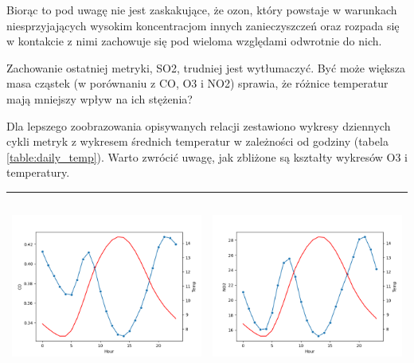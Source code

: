 \documentclass[18pt, letterpaper]{article}
\begin{document}
Biorąc to pod uwagę nie jest zaskakujące, że ozon, który powstaje w warunkach niesprzyjających wysokim koncentracjom innych zanieczyszczeń oraz rozpada się w kontakcie z nimi zachowuje się pod wieloma względami odwrotnie do nich.

Zachowanie ostatniej metryki, SO2, trudniej jest wytłumaczyć. Być może większa masa cząstek (w porównaniu z CO, O3 i NO2) sprawia, że różnice temperatur mają mniejszy wpływ na ich stężenia?

Dla lepszego zoobrazowania opisywanych relacji zestawiono wykresy dziennych cykli metryk z wykresem średnich temperatur w zależności od godziny (tabela \ref{table:daily_temp}). Warto zwrócić uwagę, jak zbliżone są kształty wykresów O3 i temperatury.

\begin{table}[H]
\centering
\begin{tabular}{|c|c|}
\hline
\includegraphics[width=80mm,height=60mm]{visualisations/cycles/hourly_CO_temp.png}  & \includegraphics[width=80mm,height=60mm]{visualisations/cycles/hourly_NO2_temp.png} \\ \hline

\end{tabular}
\end{table}
\end{document}
